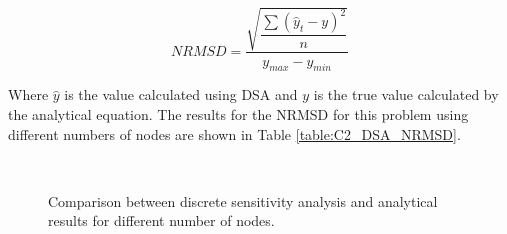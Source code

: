 \begin{equation}\label{eq:C2_NRMSD}
    NRMSD = \dfrac{\sqrt{\dfrac{\sum (\hat{y}_t - y)^2}{n}}}{y_{max} - y_{min}}
\end{equation}

Where $\hat{y}$ is the value calculated using DSA and $y$ is the true value calculated by the analytical equation. The results for the NRMSD for this problem using different numbers of nodes are shown in Table \ref{table:C2_DSA_NRMSD}.

\begin{figure}[H]
    \centering
    \quad
    \\
    \quad
    \caption{Comparison between discrete sensitivity analysis and analytical results for different number of nodes.}
    \label{fig:C2_discreteSensitivityVerification}
\end{figure}

